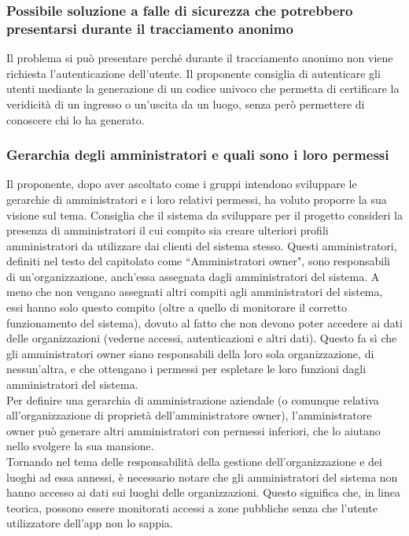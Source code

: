 \subsubsection*{Possibile soluzione a falle di sicurezza che potrebbero presentarsi durante il tracciamento anonimo}
Il problema si può presentare perché durante il tracciamento anonimo non viene richiesta l'autenticazione dell'utente.
Il proponente consiglia di autenticare gli utenti mediante la generazione di un codice univoco che permetta di certificare la veridicità di un ingresso o un'uscita da un luogo, senza però permettere di conoscere chi lo ha generato.

\subsubsection*{Gerarchia degli amministratori e quali sono i loro permessi}
Il proponente, dopo aver ascoltato come i gruppi intendono sviluppare le gerarchie di amministratori e i loro relativi permessi, ha voluto proporre la sua visione sul tema.
Consiglia che il sistema da sviluppare per il progetto consideri la presenza di amministratori il cui compito sia creare ulteriori profili amministratori da utilizzare
dai clienti del sistema stesso. Questi amministratori, definiti nel testo del capitolato come ``Amministratori owner", sono responsabili di un'organizzazione, anch'essa assegnata dagli amministratori del sistema.
A meno che non vengano assegnati altri compiti agli amministratori del sistema, essi hanno solo questo compito (oltre a quello di monitorare il corretto funzionamento del sistema), dovuto al fatto che non devono poter accedere ai dati delle organizzazioni (vederne accessi, autenticazioni e altri dati).
Questo fa sì che gli amministratori owner siano responsabili della loro sola organizzazione, di nessun'altra, e che ottengano i permessi per espletare le loro funzioni dagli amministratori del sistema.\\
Per definire una gerarchia di amministrazione aziendale (o comunque relativa all'organizzazione di proprietà dell'amministratore owner), l'amministratore owner può generare altri amministratori con permessi inferiori, che lo aiutano nello svolgere la sua mansione.\\
Tornando nel tema delle responsabilità della gestione dell'organizzazione e dei luoghi ad essa annessi, è necessario notare che gli amministratori del sistema non hanno accesso ai dati sui luoghi delle organizzazioni.
Questo significa che, in linea teorica, possono essere monitorati accessi a zone pubbliche senza che l'utente utilizzatore dell'app non lo sappia.
